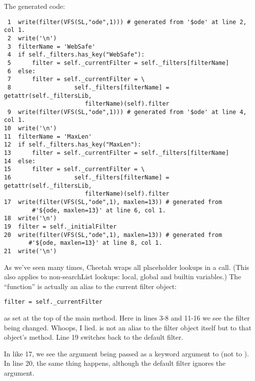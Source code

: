 The generated code:
\begin{verbatim}
 1  write(filter(VFS(SL,"ode",1))) # generated from '$ode' at line 2, col 1.
 2  write('\n')
 3  filterName = 'WebSafe'
 4  if self._filters.has_key("WebSafe"):
 5      filter = self._currentFilter = self._filters[filterName]
 6  else:
 7      filter = self._currentFilter = \
 8                  self._filters[filterName] = getattr(self._filtersLib, 
                       filterName)(self).filter
 9  write(filter(VFS(SL,"ode",1))) # generated from '$ode' at line 4, col 1.
10  write('\n')
11  filterName = 'MaxLen'
12  if self._filters.has_key("MaxLen"):
13      filter = self._currentFilter = self._filters[filterName]
14  else:
15      filter = self._currentFilter = \
16                  self._filters[filterName] = getattr(self._filtersLib, 
                       filterName)(self).filter
17  write(filter(VFS(SL,"ode",1), maxlen=13)) # generated from 
        #'${ode, maxlen=13}' at line 6, col 1.
18  write('\n')
19  filter = self._initialFilter
20  write(filter(VFS(SL,"ode",1), maxlen=13)) # generated from 
       #'${ode, maxlen=13}' at line 8, col 1.
21  write('\n')
\end{verbatim}

As we've seen many times, Cheetah wraps all placeholder lookups in a
 call.  (This also applies to non-searchList lookups: local,
global and builtin variables.)  The \code{filter} ``function''
is actually an alias to the current filter object:
\begin{verbatim}
filter = self._currentFilter
\end{verbatim}
as set at the top of the main method.  Here in lines 3-8 and 11-16 we see
the filter being changed.  Whoops, I lied.   is not an alias to
the filter object itself but to that object's \code{.filter} method.  Line 19
switches back to the default filter.  

In like 17, we see the  argument being passed as a keyword
argument to  (not to ).  In line 20, the same thing
happens, although the default filter ignores the argument.

